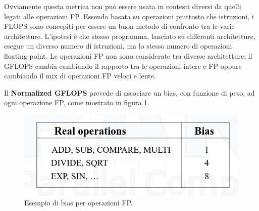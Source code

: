 Ovviamente questa metrica non può essere usata in contesti diversi da quelli legati alle operazioni FP. Essendo basata su operazioni piuttosto che istruzioni, i FLOPS sono concepiti per essere un buon metodo di confronto tra le varie architetture. L'ipotesi è che stesso programma, lanciato su differenti architetture, esegue un diverso numero di istruzioni, ma lo stesso numero di operazioni floating-point. Le operazioni FP non sono considerate tra diverse architetture; il GFLOPS cambia cambiando il rapporto tra le operazioni intere e FP oppure cambiando il mix di operazioni FP veloci e lente.

Il \textbf{Normalized GFLOPS} prevede di associare un bias, con funzione di peso, ad ogni operazione FP, come mostrato in figura \ref{fig:normalized-gflops}.
\begin{figure}[th]
	\centering
	\includegraphics[width=0.7\linewidth]{img/normalized-gflops.png}
	\caption{Esempio di bias per operazioni FP.}
	\label{fig:normalized-gflops}
\end{figure}

